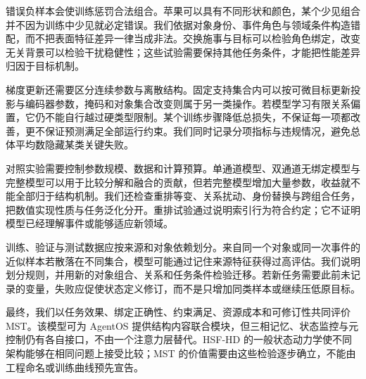 错误负样本会使训练惩罚合法组合。苹果可以具有不同形状和颜色，某个少见组合并不因为训练中少见就必定错误。我们依据对象身份、事件角色与领域条件构造错配，而不把表面特征差异一律当成非法。交换施事与目标可以检验角色绑定，改变无关背景可以检验干扰稳健性；这些试验需要保持其他任务条件，才能把性能差异归因于目标机制。

梯度更新还需要区分连续参数与离散结构。固定支持集合内可以按可微目标更新投影与编码器参数，掩码和对象集合改变则属于另一类操作。若模型学习有限关系偏置，它仍不能自行越过硬类型限制。某个训练步骤降低总损失，不保证每一项都改善，更不保证预测满足全部运行约束。我们同时记录分项指标与违规情况，避免总体平均数隐藏某类关键失败。

对照实验需要控制参数规模、数据和计算预算。单通道模型、双通道无绑定模型与完整模型可以用于比较分解和融合的贡献，但若完整模型增加大量参数，收益就不能全部归于结构机制。我们还检查重排等变、关系扰动、身份替换与跨组合任务，把数值实现性质与任务泛化分开。重排试验通过说明索引行为符合约定；它不证明模型已经理解事件或能够适应新领域。

训练、验证与测试数据应按来源和对象依赖划分。来自同一个对象或同一次事件的近似样本若散落在不同集合，模型可能通过记住来源特征获得过高评估。我们说明划分规则，并用新的对象组合、关系和任务条件检验迁移。若新任务需要此前未记录的变量，失败应促使状态定义修订，而不是只增加同类样本或继续压低原目标。

最终，我们以任务效果、绑定正确性、约束满足、资源成本和可修订性共同评价 MST。该模型可为 AgentOS 提供结构内容联合模块，但三相记忆、状态监控与元控制仍有各自接口，不由一个注意力层替代。HSF-HD 的一般状态动力学使不同架构能够在相同问题上接受比较；MST 的价值需要由这些检验逐步确立，不能由工程命名或训练曲线预先宣告。
